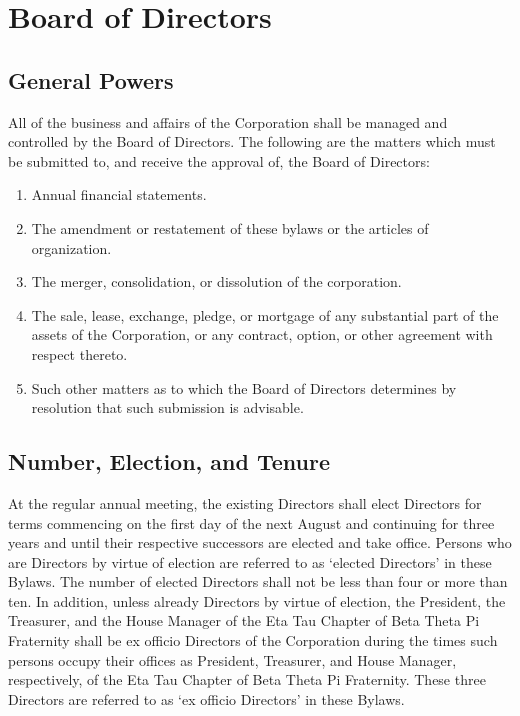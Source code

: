 \chapter{Board of Directors}

\section{General Powers}

All of the business and affairs of the Corporation shall be managed and
controlled by the Board of Directors.  The following are the matters which must
be submitted to, and receive the approval of, the Board of Directors:

\begin{enumerate}

    \item Annual financial statements.

    \item The amendment or restatement of these bylaws or the articles of
        organization.

    \item The merger, consolidation, or dissolution of the corporation.

    \item The sale, lease, exchange, pledge, or mortgage of any substantial
        part of the assets of the Corporation, or any contract, option,
        or other agreement with respect thereto.

    \item Such other matters as to which the Board of Directors determines by
    resolution that such submission is advisable.

\end{enumerate}

\section{Number, Election, and Tenure}

At the regular annual meeting, the existing Directors shall elect Directors for
terms commencing on the first day of the next August and continuing for three
years and until their respective successors are elected and take office.
Persons who are Directors by virtue of election are referred to as `elected
Directors' in these Bylaws.  The number of elected Directors shall not be less
than four or more than ten.  In addition, unless already Directors by virtue of
election, the President, the Treasurer, and the House Manager of the Eta Tau
Chapter of Beta Theta Pi Fraternity shall be ex officio Directors of the
Corporation during the times such persons occupy their offices as President,
Treasurer, and House Manager, respectively, of the Eta Tau Chapter of Beta Theta
Pi Fraternity.  These three Directors are referred to as `ex officio Directors'
in these Bylaws.

